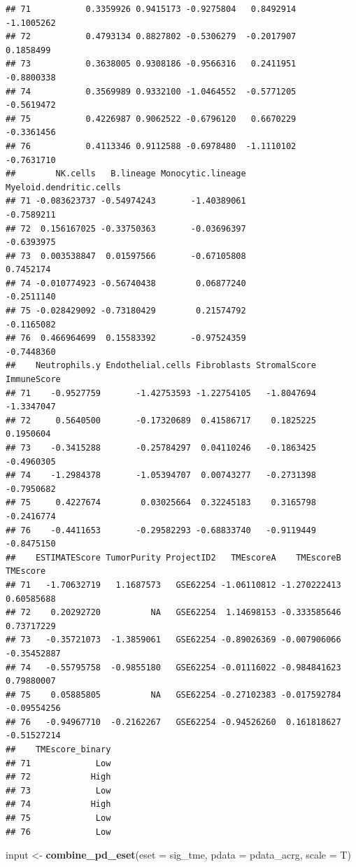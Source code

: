 \documentclass[
  12pt,
]{book}
\newenvironment{Shaded}{\begin{snugshade}}{\end{snugshade}}
\newcommand{\AttributeTok}[1]{\textcolor[rgb]{0.13,0.29,0.53}{#1}}
\newcommand{\FunctionTok}[1]{\textcolor[rgb]{0.13,0.29,0.53}{\textbf{#1}}}
\newcommand{\NormalTok}[1]{#1}
\newcommand{\OtherTok}[1]{\textcolor[rgb]{0.56,0.35,0.01}{#1}}
\begin{document}
\begin{verbatim}
## 71           0.3359926 0.9415173 -0.9275804   0.8492914            -1.1005262
## 72           0.4793134 0.8827802 -0.5306279  -0.2017907             0.1858499
## 73           0.3638005 0.9308186 -0.9566316   0.2411951            -0.8800338
## 74           0.3569989 0.9332100 -1.0464552  -0.5771205            -0.5619472
## 75           0.4226987 0.9062522 -0.6796120   0.6670229            -0.3361456
## 76           0.4113346 0.9112588 -0.6978480  -1.1110102            -0.7631710
##        NK.cells   B.lineage Monocytic.lineage Myeloid.dendritic.cells
## 71 -0.083623737 -0.54974243       -1.40389061              -0.7589211
## 72  0.156167025 -0.33750363       -0.03696397              -0.6393975
## 73  0.003538847  0.01597566       -0.67105808               0.7452174
## 74 -0.010774923 -0.56740438        0.06877240              -0.2511140
## 75 -0.028429092 -0.73180429        0.21574792              -0.1165082
## 76  0.466964699  0.15583392       -0.97524359              -0.7448360
##    Neutrophils.y Endothelial.cells Fibroblasts StromalScore ImmuneScore
## 71    -0.9527759       -1.42753593 -1.22754105   -1.8047694  -1.3347047
## 72     0.5640500       -0.17320689  0.41586717    0.1825225   0.1950604
## 73    -0.3415288       -0.25784297  0.04110246   -0.1863425  -0.4960305
## 74    -1.2984378       -1.05394707  0.00743277   -0.2731398  -0.7950682
## 75     0.4227674        0.03025664  0.32245183    0.3165798  -0.2416774
## 76    -0.4411653       -0.29582293 -0.68833740   -0.9119449  -0.8475150
##    ESTIMATEScore TumorPurity ProjectID2   TMEscoreA    TMEscoreB    TMEscore
## 71   -1.70632719   1.1687573   GSE62254 -1.06110812 -1.270222413  0.60585688
## 72    0.20292720          NA   GSE62254  1.14698153 -0.333585646  0.73717229
## 73   -0.35721073  -1.3859061   GSE62254 -0.89026369 -0.007906066 -0.35452887
## 74   -0.55795758  -0.9855180   GSE62254 -0.01116022 -0.984841623  0.79880007
## 75    0.05885805          NA   GSE62254 -0.27102383 -0.017592784 -0.09554256
## 76   -0.94967710  -0.2162267   GSE62254 -0.94526260  0.161818627 -0.51527214
##    TMEscore_binary
## 71             Low
## 72            High
## 73             Low
## 74            High
## 75             Low
## 76             Low
\end{verbatim}

\begin{Shaded}
\begin{Highlighting}[]
\NormalTok{input }\OtherTok{\textless{}{-}} \FunctionTok{combine\_pd\_eset}\NormalTok{(}\AttributeTok{eset =}\NormalTok{ sig\_tme, }\AttributeTok{pdata =}\NormalTok{ pdata\_acrg, }\AttributeTok{scale =}\NormalTok{ T)}
\end{Highlighting}
\end{Shaded}
\end{document}

